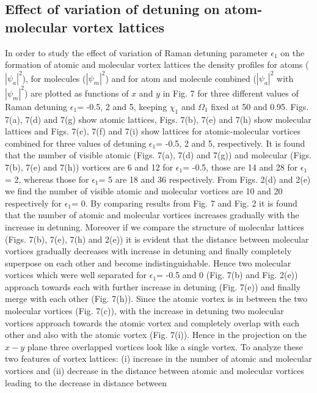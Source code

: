 \documentclass[10pt,a4paper]{article}
\begin{document}
\subsection{Effect of variation of detuning on atom-molecular vortex lattices}

In order to study the effect of variation of Raman detuning
parameter $\epsilon_1$ on the formation of atomic and molecular
vortex lattices the density profiles for atoms ($|\psi_a|^2$),
for molecules ($|\psi_m|^2$) and for atom and molecule combined 
($|\psi_a|^2$ with $|\psi_m|^2$) are plotted as functions of $x$
and $y$ in Fig. 7 for three different values of Raman detuning
$\epsilon_1$= -0.5, 2 and 5, keeping $\chi_1$ and $\Omega_1$ fixed
at 50 and 0.95. Figs. 7(a), 7(d) and 7(g) show atomic lattices,
Figs. 7(b), 7(e) and 7(h) show molecular lattices and Figs.
7(c), 7(f) and 7(i) show lattices for atomic-molecular vortices combined for
three values of detuning $\epsilon_1$= -0.5, 2 and 5, respectively.
It is found that the number of visible atomic (Figs. 7(a), 7(d)
and 7(g)) and molecular (Figs. 7(b), 7(e) and 7(h)) vortices are 6
and 12 for $\epsilon_1$= -0.5, those are 14 and 28 for
$\epsilon_1$= 2, whereas those for $\epsilon_1$= 5 are 18 and 36
respectively. From Figs. 2(d) and 2(e) we find the number of
visible atomic and molecular vortices are 10 and 20 respectively
for $\epsilon_1$= 0. By comparing results from Fig. 7 and Fig. 2
it is found that the number of atomic and molecular vortices
increases gradually with the increase in detuning. Moreover if we
compare the structure of molecular lattices (Figs. 7(b), 7(e),
7(h) and 2(e)) it is evident that the distance between molecular
vortices gradually decreases with increase in detuning and finally
completely superpose on each other and become indistinguishable.
Hence two molecular vortices which were well separated for 
$\epsilon_1$= -0.5 and 0 (Fig. 7(b) and Fig. 2(e))
approach towards each with further increase in detuning
(Fig. 7(e)) and finally merge with each other (Fig. 7(h)). Since the atomic vortex is in between the two molecular
vortices (Fig. 7(c)), with the increase in detuning two molecular
vortices approach towards the atomic vortex and completely overlap
with each other and also with the atomic vortex (Fig. 7(i)). Hence in the projection on the $x-y$ plane
three overlapped vortices look like a single vortex. To analyze
these two features of vortex lattices: (i) increase in the number
of atomic and molecular vortices and (ii) decrease in the
distance between atomic and molecular vortices leading to the decrease in distance between
\end{document}
